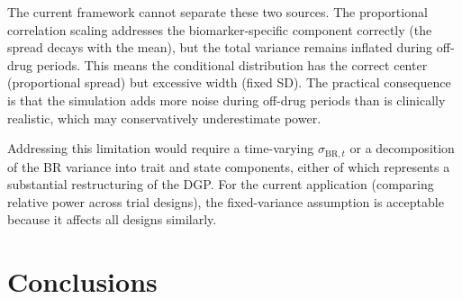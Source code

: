\documentclass[11pt]{article}
\begin{document}
The current framework cannot separate these two sources.
The proportional correlation scaling addresses the
biomarker-specific component correctly (the spread decays
with the mean), but the total variance remains inflated
during off-drug periods. This means the conditional
distribution has the correct center (proportional spread)
but excessive width (fixed SD). The practical consequence
is that the simulation adds more noise during off-drug
periods than is clinically realistic, which may
conservatively underestimate power.

Addressing this limitation would require a time-varying
$\sigma_{\text{BR},t}$ or a decomposition of the BR
variance into trait and state components, either of which
represents a substantial restructuring of the DGP. For the
current application (comparing relative power across trial
designs), the fixed-variance assumption is acceptable
because it affects all designs similarly.

\section{Conclusions}
\end{document}
